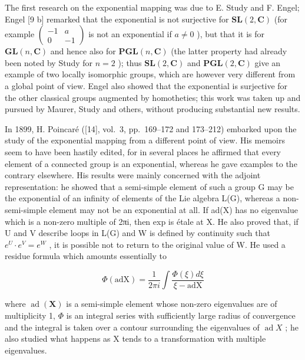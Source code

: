 
The first research on the exponential mapping was due to E. Study and F. Engel; Engel {[}9 b{]} remarked that the exponential is not surjective for \(\mathbf{SL}(2, \mathbf{C})\) (for example \(\begin{pmatrix} -1 & a \\ 0 & -1 \end{pmatrix}\) is not an exponential if \(a \neq 0\) ), but that it is for \(\mathbf{GL}(n, \mathbf{C})\) and hence also for \(\mathbf{PGL}(n, \mathbf{C})\) (the latter property had already been noted by Study for \(n = 2\) ); thus \(\mathbf{SL}(2, \mathbf{C})\) and \(\mathbf{PGL}(2, \mathbf{C})\) give an example of two locally isomorphic groups, which are however very different from a global point of view. Engel also showed that the exponential is surjective for the other classical groups augmented by homotheties; this work was taken up and pursued by Maurer, Study and others, without producing substantial new results.

In 1899, H. Poincaré ({[}14{]}, vol.~3, pp.~169--172 and 173--212) embarked upon the study of the exponential mapping from a different point of view. His memoirs seem to have been hastily edited, for in several places he affirmed that every element of a connected group is an exponential, whereas he gave examples to the contrary elsewhere. His results were mainly concerned with the adjoint representation: he showed that a semi-simple element of such a group G may be the exponential of an infinity of elements of the Lie algebra L(G), whereas a non-semi-simple element may not be an exponential at all. If ad(X) has no eigenvalue which is a non-zero multiple of 2πi, then exp is étale at X. He also proved that, if U and V describe loops in L(G) and W is defined by continuity such that \(e^{U} \cdot e^{V} = e^{W}\) , it is possible not to return to the original value of W. He used a residue formula which amounts essentially to

\[
\Phi (\mathrm{adX}) = \frac {1}{2 \pi i} \int \frac {\Phi (\xi) d \xi}{\xi - \mathrm{adX}}
\]

where \(\operatorname{ad}(\mathbf{X})\) is a semi-simple element whose non-zero eigenvalues are of multiplicity 1, \(\Phi\) is an integral series with sufficiently large radius of convergence and the integral is taken over a contour surrounding the eigenvalues of \(\operatorname{ad} X\) ; he also studied what happens as X tends to a transformation with multiple eigenvalues.

